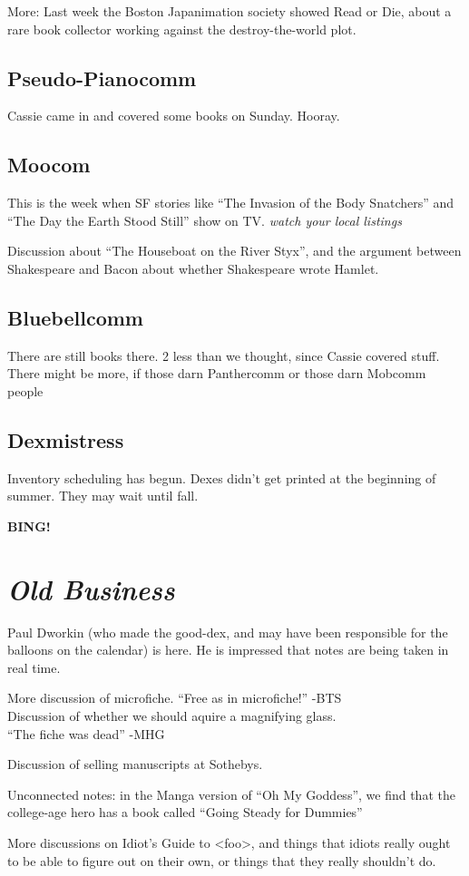 \documentclass[12pt]{article}
\newcommand{\bing}{{\bf BING!} }
\newcommand{\goto}[1]{\bing \vskip 12pt \section*{{\em{#1}}}}
\begin{document}
More: Last week the Boston Japanimation society showed Read or Die,
about a rare book collector working against the destroy-the-world plot.

\subsection*{Pseudo-Pianocomm}
Cassie came in and covered some books on Sunday. Hooray.

\subsection*{Moocom}
This is the week when SF stories like ``The Invasion of the Body
Snatchers'' and ``The Day the Earth Stood Still'' show on TV. 
\emph{watch your local listings}

Discussion about ``The Houseboat on the River Styx'', and the argument
between Shakespeare and Bacon about whether Shakespeare wrote Hamlet.

\subsection*{Bluebellcomm}
There are still books there.  2 less than we thought, since Cassie
covered stuff.  There might be more, if those darn Panthercomm or
those darn Mobcomm people 

\subsection*{Dexmistress}
Inventory scheduling has begun.  Dexes didn't get printed at the
beginning of summer. They may wait until fall.

\goto{Old Business}
Paul Dworkin (who made the good-dex, and may have been responsible for the
balloons on the calendar) is here. He is impressed that notes are
being taken in real time.

More discussion of microfiche. ``Free as in microfiche!'' -BTS\\
Discussion of whether we should aquire a magnifying glass.\\
``The fiche was dead'' -MHG

Discussion of selling manuscripts at Sothebys.

Unconnected notes: in the Manga version of ``Oh My Goddess'', we find
that the college-age hero has a book called ``Going Steady for
Dummies''

More discussions on Idiot's Guide to <foo>, and things that idiots
really ought to be able to figure out on their own, or things that
they really shouldn't do.
\end{document}
